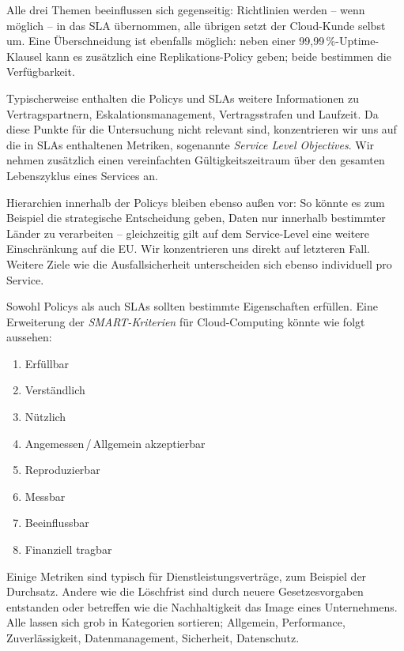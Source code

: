 \noindent Alle drei Themen beeinflussen sich gegenseitig: Richtlinien werden -- wenn möglich -- in das SLA übernommen, alle übrigen setzt der Cloud-Kunde selbst um. Eine Überschneidung ist ebenfalls möglich: neben einer 99,99\,\%-Uptime-Klausel kann es zusätzlich eine Replikations-Policy geben; beide bestimmen die Verfügbarkeit.

Typischerweise enthalten die Policys und SLAs weitere Informationen zu Vertragspartnern, Eskalationsmanagement, Vertragsstrafen und Laufzeit. Da diese Punkte für die Untersuchung nicht relevant sind, konzentrieren wir uns auf die in SLAs enthaltenen Metriken, sogenannte \emph{Service Level Objectives}. Wir nehmen zusätzlich einen vereinfachten Gültigkeitszeitraum über den gesamten Lebenszyklus eines Services an. 

Hierarchien innerhalb der Policys bleiben ebenso außen vor: So könnte es zum Beispiel die strategische Entscheidung geben, Daten nur innerhalb bestimmter Länder zu verarbeiten -- gleichzeitig gilt auf dem Service-Level eine weitere Einschränkung auf die EU. Wir konzentrieren uns direkt auf letzteren Fall. Weitere Ziele wie die Ausfallsicherheit unterscheiden sich ebenso individuell pro Service.

Sowohl Policys als auch SLAs sollten bestimmte Eigenschaften erfüllen. Eine Erweiterung der \emph{SMART-Kriterien} \cite{doran:1981:smart-goals} für Cloud-Computing könnte wie folgt aussehen:

\begin{enumerate}
	\item Erfüllbar
	\item Verständlich
	\item Nützlich
	\item Angemessen\,/\,Allgemein akzeptierbar
	\item Reproduzierbar
	\item Messbar
	\item Beeinflussbar
	\item Finanziell tragbar
\end{enumerate}

\noindent 
Einige Metriken sind typisch für Dienstleistungsverträge, zum Beispiel der Durchsatz. Andere wie die Löschfrist sind durch neuere Gesetzesvorgaben entstanden oder betreffen wie die Nachhaltigkeit das Image eines Unternehmens. Alle lassen sich grob in Kategorien sortieren; Allgemein, Performance, Zuverlässigkeit, Datenmanagement, Sicherheit, Datenschutz.

